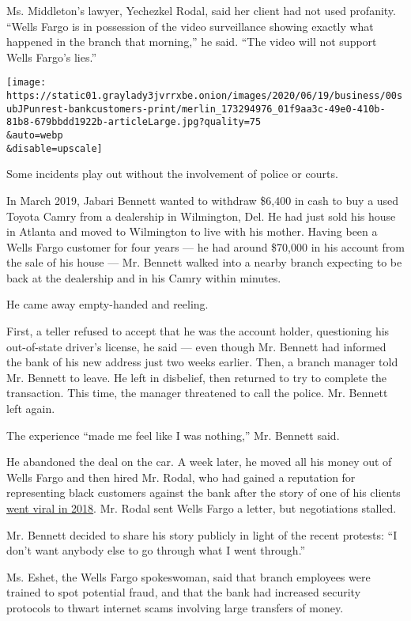 Ms. Middleton's lawyer, Yechezkel Rodal, said her client had not used
profanity. ``Wells Fargo is in possession of the video surveillance
showing exactly what happened in the branch that morning,'' he said.
``The video will not support Wells Fargo's lies.''

\texttt{[image: https://static01.graylady3jvrrxbe.onion/images/2020/06/19/business/00subJPunrest-bankcustomers-print/merlin\_173294976\_01f9aa3c-49e0-410b-81b8-679bbdd1922b-articleLarge.jpg?quality=75\\\&auto=webp\\\&disable=upscale]}

Some incidents play out without the involvement of police or courts.

In March 2019, Jabari Bennett wanted to withdraw \$6,400 in cash to buy
a used Toyota Camry from a dealership in Wilmington, Del. He had just
sold his house in Atlanta and moved to Wilmington to live with his
mother. Having been a Wells Fargo customer for four years --- he had
around \$70,000 in his account from the sale of his house --- Mr.
Bennett walked into a nearby branch expecting to be back at the
dealership and in his Camry within minutes.

He came away empty-handed and reeling.

First, a teller refused to accept that he was the account holder,
questioning his out-of-state driver's license, he said --- even though
Mr. Bennett had informed the bank of his new address just two weeks
earlier. Then, a branch manager told Mr. Bennett to leave. He left in
disbelief, then returned to try to complete the transaction. This time,
the manager threatened to call the police. Mr. Bennett left again.

The experience ``made me feel like I was nothing,'' Mr. Bennett said.

He abandoned the deal on the car. A week later, he moved all his money
out of Wells Fargo and then hired Mr. Rodal, who had gained a reputation
for representing black customers against the bank after the story of one
of his clients
\href{https://www.washingtonpost.com/news/business/wp/2018/07/27/a-black-woman-says-wells-fargo-didnt-want-to-cash-her-check-shes-suing-for-discrimination/}{went
viral in 2018}. Mr. Rodal sent Wells Fargo a letter, but negotiations
stalled.

Mr. Bennett decided to share his story publicly in light of the recent
protests: ``I don't want anybody else to go through what I went
through.''

Ms. Eshet, the Wells Fargo spokeswoman, said that branch employees were
trained to spot potential fraud, and that the bank had increased
security protocols to thwart internet scams involving large transfers of
money.

